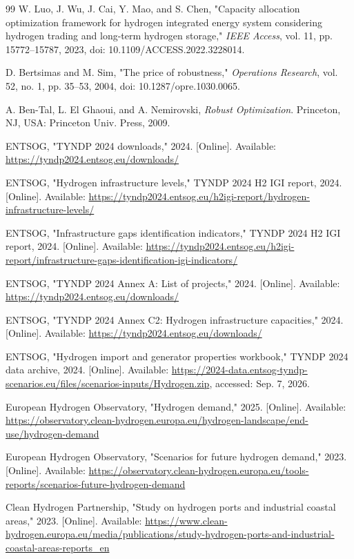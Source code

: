 \documentclass{ieeeaccess}
\begin{document}
\begin{thebibliography}{99}
W. Luo, J. Wu, J. Cai, Y. Mao, and S. Chen, "Capacity allocation optimization framework for hydrogen integrated energy system considering hydrogen trading and long-term hydrogen storage," \emph{IEEE Access}, vol. 11, pp. 15772--15787, 2023, doi: 10.1109/ACCESS.2022.3228014.

D. Bertsimas and M. Sim, "The price of robustness," \emph{Operations Research}, vol. 52, no. 1, pp. 35--53, 2004, doi: 10.1287/opre.1030.0065.

A. Ben-Tal, L. El Ghaoui, and A. Nemirovski, \emph{Robust Optimization}. Princeton, NJ, USA: Princeton Univ. Press, 2009.

ENTSOG, "TYNDP 2024 downloads," 2024. [Online]. Available: \url{https://tyndp2024.entsog.eu/downloads/}

ENTSOG, "Hydrogen infrastructure levels," TYNDP 2024 H2 IGI report, 2024. [Online]. Available: \url{https://tyndp2024.entsog.eu/h2igi-report/hydrogen-infrastructure-levels/}

ENTSOG, "Infrastructure gaps identification indicators," TYNDP 2024 H2 IGI report, 2024. [Online]. Available: \url{https://tyndp2024.entsog.eu/h2igi-report/infrastructure-gaps-identification-igi-indicators/}

ENTSOG, "TYNDP 2024 Annex A: List of projects," 2024. [Online]. Available: \url{https://tyndp2024.entsog.eu/downloads/}

ENTSOG, "TYNDP 2024 Annex C2: Hydrogen infrastructure capacities," 2024. [Online]. Available: \url{https://tyndp2024.entsog.eu/downloads/}

ENTSOG, "Hydrogen import and generator properties workbook," TYNDP 2024 data archive, 2024. [Online]. Available: \url{https://2024-data.entsog-tyndp-scenarios.eu/files/scenarios-inputs/Hydrogen.zip}, accessed: Sep. 7, 2026.

European Hydrogen Observatory, "Hydrogen demand," 2025. [Online]. Available: \url{https://observatory.clean-hydrogen.europa.eu/hydrogen-landscape/end-use/hydrogen-demand}

European Hydrogen Observatory, "Scenarios for future hydrogen demand," 2023. [Online]. Available: \url{https://observatory.clean-hydrogen.europa.eu/tools-reports/scenarios-future-hydrogen-demand}

Clean Hydrogen Partnership, "Study on hydrogen ports and industrial coastal areas," 2023. [Online]. Available: \url{https://www.clean-hydrogen.europa.eu/media/publications/study-hydrogen-ports-and-industrial-coastal-areas-reports_en}


\end{thebibliography}
\end{document}
